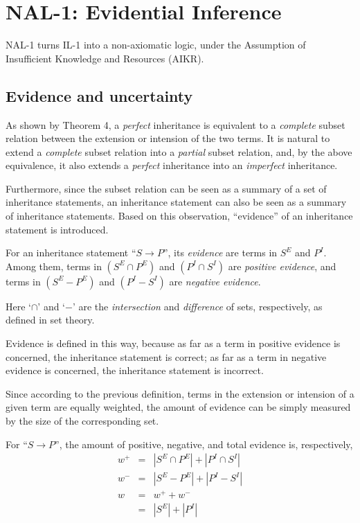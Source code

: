 \chapter{NAL-1: Evidential Inference}

NAL-1 turns IL-1 into a non-axiomatic logic, under the Assumption of Insufficient Knowledge and Resources (AIKR).

\section{Evidence and uncertainty}

As shown by Theorem 4, a \emph{perfect} inheritance is equivalent to a \emph{complete} subset relation between the extension or intension of the two terms. It is natural to extend a \emph{complete} subset relation into a \emph{partial} subset relation, and, by the above equivalence, it also extends a \emph{perfect} inheritance into an \emph{imperfect} inheritance.

Furthermore, since the subset relation can be seen as a summary of a set of inheritance statements, an inheritance statement can also be seen as a summary of inheritance statements. Based on this observation, ``evidence'' of an inheritance statement is introduced.

\begin{defi}
For an inheritance statement ``\(S \rightarrow P\)'', its {\em evidence} are terms in \(S^E\) and \(P^I\).  Among them, terms in \((S^E \cap P^E)\) and \((P^I \cap S^I)\) are {\em positive evidence}, and terms in \((S^E - P^E)\) and \((P^I - S^I)\) are {\em negative evidence}.
\end{defi}
Here `$\cap$' and `$-$' are the \emph{intersection} and \emph{difference} of sets, respectively, as defined in set theory.

Evidence is defined in this way, because as far as a term in positive evidence is concerned, the inheritance statement is correct; as far as a term in negative evidence is concerned, the inheritance statement is incorrect.

Since according to the previous definition, terms in the extension or intension of a given term are equally weighted, the amount of evidence can be simply measured by the size of the corresponding set.
\begin{defi}
For ``\(S \rightarrow P\)'', the amount of positive, negative, and total evidence is, respectively,
\[\begin{array}{lcl}
w^+ & = & |S^E \cap P^E| + |P^I \cap S^I| \\
w^- & = & |S^E - P^E| + |P^I - S^I| \\
w & = & w^+ + w^- \\
& = & |S^E| + |P^I|
\end{array}\]
\end{defi}

